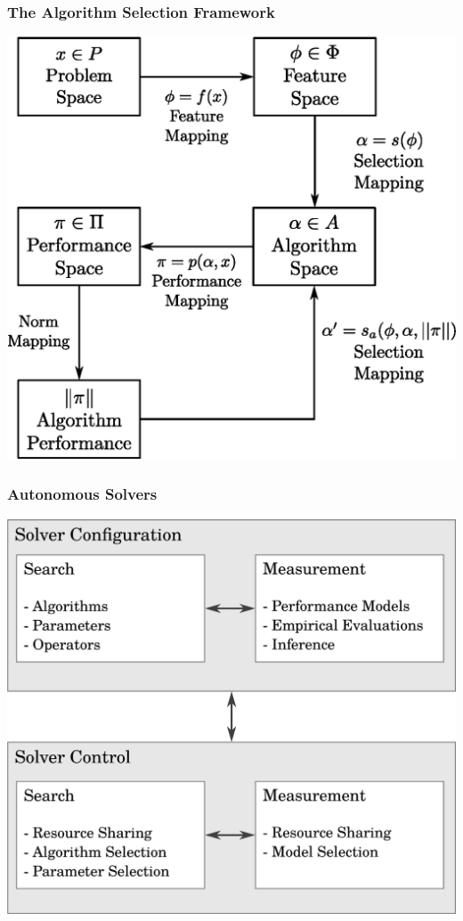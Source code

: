 \documentclass[10pt, compress, aspectratio=169]{beamer}
\begin{document}
\begin{frame}
    \frametitle{The Algorithm Selection Framework}
    \begin{center}
        \includegraphics[height=.9\textheight]{algorithm-selection}
    \end{center}
\end{frame}

\begin{frame}
    \frametitle{Autonomous Solvers}
    \begin{center}
        \includegraphics[height=.9\textheight]{general_solver}
    \end{center}
\end{frame}
\end{document}
